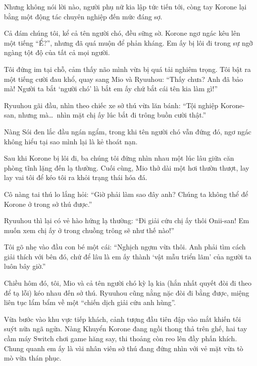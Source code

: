 \documentclass[../main.tex]{subfiles}
\begin{document}
Nhưng không nói lời nào, người phụ nữ kia lập tức tiến tới, còng tay Korone lại bằng một động tác chuyên nghiệp đến mức đáng sợ.


Cả đám chúng tôi, kể cả tên người chó, đều sững sờ. Korone ngơ ngác kêu lên một tiếng ``Ể?'', nhưng đã quá muộn để phản kháng. Em ấy bị lôi đi trong sự ngỡ ngàng tột độ của tất cả mọi người.

Tôi đứng im tại chỗ, cảm thấy não mình vừa bị quá tải nghiêm trọng. Tôi bật ra một tiếng cười đau khổ, quay sang Mio và Ryuuhou: ``Thấy chưa? Anh đã bảo mà! Người ta bắt `người chó' là bắt em ấy chứ bắt cái tên kia làm gì!''

Ryuuhou gãi đầu, nhìn theo chiếc xe sở thú vừa lăn bánh: ``Tội nghiệp Korone-san, nhưng mà\dots\ nhìn mặt chị ấy lúc bắt đi trông buồn cười thật.''

Nàng Sói đen lắc đầu ngán ngẩm, trong khi tên người chó vẫn đứng đó, ngơ ngác không hiểu tại sao mình lại là kẻ thoát nạn.

\omk

Sau khi Korone bị lôi đi, ba chúng tôi đứng nhìn nhau một lúc lâu giữa căn phòng tĩnh lặng đến lạ thường. Cuối cùng, Mio thở dài một hơi thườn thượt, lay lay vai tôi để kéo tôi ra khỏi trạng thái hóa đá.

Cô nàng tai thú lo lắng hỏi: ``Giờ phải làm sao đây anh? Chúng ta không thể để Korone ở trong sở thú được.''

Ryuuhou thì lại có vẻ hào hứng lạ thường: ``Đi giải cứu chị ấy thôi Onii-san! Em muốn xem chị ấy ở trong chuồng trông sẽ như thế nào!''

Tôi gõ nhẹ vào đầu con bé một cái: ``Nghịch ngợm vừa thôi. Anh phải tìm cách giải thích với bên đó, chứ để lâu là em ấy thành `vật mẫu triển lãm' của người ta luôn bây giờ.''

\ct

Chiều hôm đó, tôi, Mio và cả tên người chó kỳ lạ kia (hắn nhất quyết đòi đi theo để tạ lỗi) kéo nhau đến sở thú. Ryuuhou cũng nằng nặc đòi đi bằng được, miệng liên tục lẩm bẩm về một ``chiến dịch giải cứu anh hùng''.

Vừa bước vào khu vực tiếp khách, cảnh tượng đầu tiên đập vào mắt khiến tôi suýt nữa ngã ngửa. Nàng Khuyển Korone đang ngồi thong thả trên ghế, hai tay cầm máy Switch chơi game hăng say, thi thoảng còn reo lên đầy phấn khích. Chung quanh em ấy là vài nhân viên sở thú đang đứng nhìn với vẻ mặt vừa tò mò vừa thán phục.
\end{document}
